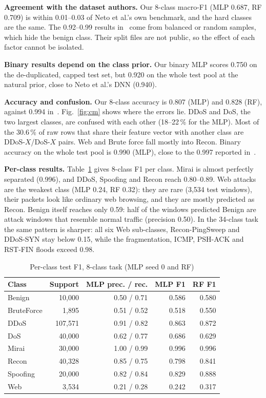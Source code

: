\documentclass[conference]{IEEEtran}
\begin{document}
\textbf{Agreement with the dataset authors.} Our 8-class macro-F1 (MLP 0.687, RF 0.709) is within 0.01--0.03 of Neto et al.'s own benchmark, and the hard classes are the same. The 0.92--0.99 results in~\cite{bilal2026dataset,nayak2026byzantine} come from balanced or random samples, which hide the benign class. Their split files are not public, so the effect of each factor cannot be isolated.

\textbf{Binary results depend on the class prior.} Our binary MLP scores 0.750 on the de-duplicated, capped test set, but 0.920 on the whole test pool at the natural prior, close to Neto et al.'s DNN (0.940).

\textbf{Accuracy and confusion.} Our 8-class accuracy is 0.807 (MLP) and 0.828 (RF), against 0.994 in~\cite{neto2023ciciot}. Fig.~\ref{fig:cm} shows where the errors lie. DDoS and DoS, the two largest classes, are confused with each other (18--22\,\% for the MLP). Most of the 30.6\,\% of raw rows that share their feature vector with another class are DDoS-$X$/DoS-$X$ pairs. Web and Brute force fall mostly into Recon. Binary accuracy on the whole test pool is 0.990 (MLP), close to the 0.997 reported in~\cite{neto2023ciciot}.

\textbf{Per-class results.} Table~\ref{tab:perclass} gives 8-class F1 per class. Mirai is almost perfectly separated (0.996), and DDoS, Spoofing and Recon reach 0.80--0.89. Web attacks are the weakest class (MLP 0.24, RF 0.32): they are rare (3,534 test windows), their packets look like ordinary web browsing, and they are mostly predicted as Recon. Benign itself reaches only 0.59: half of the windows predicted Benign are attack windows that resemble normal traffic (precision 0.50). In the 34-class task the same pattern is sharper: all six Web sub-classes, Recon-PingSweep and DDoS-SYN stay below 0.15, while the fragmentation, ICMP, PSH-ACK and RST-FIN floods exceed 0.98.

\begin{table}[t]
\caption{Per-class test F1, 8-class task (MLP seed 0 and RF)}\label{tab:perclass}
\centering\footnotesize
\begin{tabular}{@{}lrrrr@{}}
\toprule
Class & Support & MLP prec. / rec. & MLP F1 & RF F1 \\
\midrule
Benign & 10,000 & 0.50 / 0.71 & 0.586 & 0.580 \\
BruteForce & 1,895 & 0.51 / 0.52 & 0.518 & 0.550 \\
DDoS & 107,571 & 0.91 / 0.82 & 0.863 & 0.872 \\
DoS & 40,000 & 0.62 / 0.77 & 0.686 & 0.629 \\
Mirai & 30,000 & 1.00 / 0.99 & 0.996 & 0.996 \\
Recon & 40,328 & 0.85 / 0.75 & 0.798 & 0.841 \\
Spoofing & 20,000 & 0.82 / 0.84 & 0.829 & 0.888 \\
Web & 3,534 & 0.21 / 0.28 & 0.242 & 0.317 \\
\bottomrule
\end{tabular}
\end{table}
\end{document}
